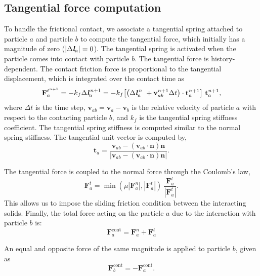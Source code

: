 \documentclass[preprint,12pt]{elsarticle}
\newcommand{\ten}[1]{\ensuremath{\mathbf{#1}}}
\begin{document}
\subsection{Tangential force computation}
\label{sec:tangential-force-computation}
To handle the frictional contact, we associate a tangential spring attached to
particle $a$ and particle $b$ to compute the tangential force, which initially has
a magnitude of zero ($|\Delta \textit{\textbf{l}}_a|=0$). The tangential spring
is activated when the particle comes into contact with particle $b$. The
tangential force is history-dependent. The contact friction force is
proportional to the tangential displacement, which is integrated over
the contact time as
\begin{equation}
  \label{eq:tangential-force}
  \ten{F}_{a}^{t^{n+1}} =
  -k_f \Delta \textit{\textbf{l}}_a^{\,n + 1} =
  -k_f \big[\big(\Delta {\textit{\textbf{l}}}_a^{\,n} \
  + \ten{v}_{ab}^{n + 1} \Delta t\big) \cdot \ten{t}_a^{n + 1} \big] \
  \ten{t}_a^{n + 1},
\end{equation}
where $\Delta t$ is the time step, $\ten{v}_{ab} = \ten{v}_{a} - \ten{v}_b$ is the
relative velocity of particle $a$ with respect to the contacting particle $b$,
and $k_f$ is the tangential spring stiffness coefficient. The tangential
spring stiffness is computed similar to the normal spring
stiffness\cite{golshan2023lethe}.  The tangential unit vector is computed by,
\begin{equation}
  \label{eq:tangential-vect}
  \ten{t}_a = \frac{\ten{v}_{ab} - (\ten{v}_{ab} \cdot \ten{n}) \ten{n}}{|\ten{v}_{ab} - (\ten{v}_{ab} \cdot \ten{n}) \ten{n}|}.
\end{equation}

The tangential force is coupled to the normal force through the Coulomb's law,
\begin{equation}
  \label{eq:Coulomb-law}
  \ten{F}_{a}^{t} = \min(\mu |\ten{F}_{a}^{n}|, |\ten{F}_{a}^{t}|) \
  \frac{\ten{F}_{a}^{t}}{|\ten{F}_{a}^{t}|}.
\end{equation}
This allows us to impose the sliding friction condition between the
interacting solids. Finally, the total force acting on the particle $a$ due to
the interaction with particle $b$ is:
\begin{equation}
  \label{eq:contact-force}
  \ten{F}_{a}^{\text{cont}} = \ten{F}_{a}^{n} + \ten{F}_{a}^{t}
\end{equation}

An equal and opposite force of the same magnitude is applied to
particle $b$, given as
\begin{equation}
  \label{eq:contact-force}
  \ten{F}_{b}^{\text{cont}} = - \ten{F}_{a}^{\text{cont}}.
\end{equation}
\end{document}
